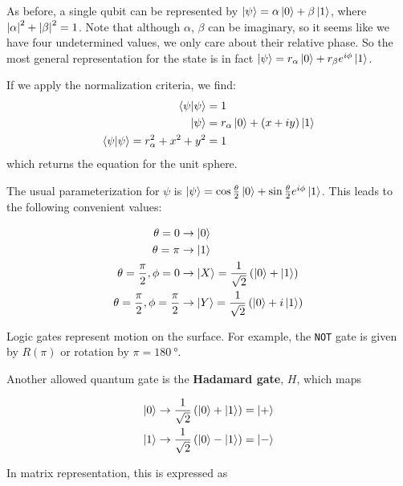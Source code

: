 \documentclass[12pt, english]{book}
\begin{document}
As before, a single qubit can be represented by $\ket{\psi} = \alpha \ket{0} + \beta \ket{1}$, where $\abs{\alpha}^2 + \abs{\beta}^2 = 1$.
Note that although $\alpha$, $\beta$ can be imaginary, so it seems like we have four undetermined values, we only care about their relative phase.
So the most general representation for the state is in fact $\ket{\psi} = r_{\alpha} \ket{0} + r_{\beta} e^{i \phi} \ket{1}$.

If we apply the normalization criteria, we find:
\begin{align*}
	\braket{\psi}{\psi} &= 1 \\
	\ket{\psi} &= r_{\alpha} \ket{0} + (x + iy) \ket{1} \\
	\braket{\psi}{\psi} = r_{\alpha}^2 + x^2 + y^2 &= 1 \\
\end{align*}
which returns the equation for the unit sphere.

The usual parameterization for $\psi$ is $\ket{\psi} = \cos \frac{\theta}{2} \ket{0} + \sin \frac{\theta}{2} e^{i \phi} \ket{1}$.
This leads to the following convenient values:

\begin{align*}
	\theta = 0  &\rightarrow  \ket{0} \\
	\theta = \pi  &\rightarrow  \ket{1} \\
	\theta = \frac{\pi}{2}, \phi = 0  &\rightarrow  \ket{X} = \frac{1}{\sqrt{2}} \left( \ket{0} + \ket{1} \right) \\
	\theta = \frac{\pi}{2}, \phi = \frac{\pi}{2}  &\rightarrow  \ket{Y} = \frac{1}{\sqrt{2}} \left( \ket{0} + i\ket{1} \right) \\
\end{align*}

Logic gates represent motion on the surface.
For example, the \texttt{NOT} gate is given by $R(\pi)$ or rotation by $\pi = \SI{180}{\degree}$.

Another allowed quantum gate is the \textbf{Hadamard gate}, $H$, which maps

\begin{align*}
	\ket{0} &\rightarrow \frac{1}{\sqrt{2}} \left( \ket{0} + \ket{1} \right) = \ket{+} \\
	\ket{1} &\rightarrow \frac{1}{\sqrt{2}} \left( \ket{0} - \ket{1} \right) = \ket{-}
\end{align*}

In matrix representation, this is expressed as 
\end{document}
